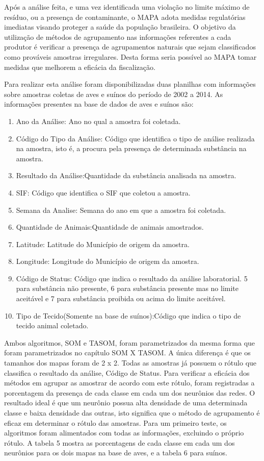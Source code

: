 Após a análise feita, e uma vez identificada uma violação no limite máximo de resíduo, ou a presença de contaminante, o MAPA adota medidas regulatórias imediatas visando proteger a saúde da população brasileira. O objetivo da utilização de métodos de agrupamento nas informações referentes a cada produtor é verificar a presença de agrupamentos naturais que sejam classificados como prováveis amostras irregulares. Desta forma seria possível ao MAPA tomar medidas que melhorem a eficácia da fiscalização.

Para realizar esta análise foram disponibilizadas duas planilhas com informações sobre amostras coletas de aves e suínos do período de 2002 a 2014. As informações presentes na base de dados de aves e suínos são:

\begin{enumerate}
\item Ano da Análise: Ano no qual a amostra foi coletada.
\item Código do Tipo da Análise: Código que identifica o tipo de análise realizada na amostra, isto é, a procura pela presença de determinada substância na amostra.
\item Resultado da Análise:Quantidade da substância analisada na amostra.
\item SIF: Código que identifica o SIF que coletou a amostra.
\item Semana da Analise: Semana do ano em que a amostra foi coletada.
\item Quantidade de Animais:Quantidade de animais amostrados.
\item Latitude: Latitude do Município de origem da amostra.
\item Longitude: Longitude do Município de origem da amostra.
\item Código de Status: Código que indica o resultado da análise laboratorial. 5 para substância não presente, 6 para substância presente mas no limite aceitável e 7 para substância proibida ou acima do limite aceitável.
\item Tipo de Tecido(Somente na base de suínos):Código que indica o tipo de tecido animal coletado.
\end{enumerate}

Ambos algoritmos, SOM e TASOM, foram parametrizados da mesma forma que foram parametrizados no capítulo SOM X TASOM. A única diferença é que os tamanhos dos mapas foram de 2 x 2. Todas as amostras já possuem o rótulo que classifica o resultado da análise, Código de Status. Para verificar a eficácia dos métodos em agrupar as amostrar de acordo com este rótulo, foram registradas a porcentagem da presença de cada classe em cada um dos neurônios das redes. O resultado ideal é que um neurônio possua alta densidade de uma determinada classe e baixa densidade das outras, isto significa que o método de agrupamento é eficaz em determinar o rótulo das amostras. Para um primeiro teste, os algoritmos foram alimentados com todas as informações, excluindo o próprio rótulo. A tabela 5 mostra as porcentagens de cada classe em cada um dos neurônios para os dois mapas na base de aves, e a tabela 6 para suínos. 

